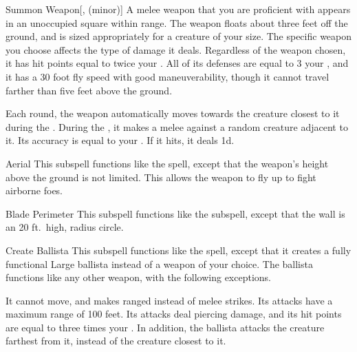 \begin{ability}[\nth{1}]{Summon Weapon}[,  (minor)]
A melee weapon that you are proficient with appears in an unoccupied square within \rngmed range.
The weapon floats about three feet off the ground, and is sized appropriately for a creature of your size.
The specific weapon you choose affects the type of damage it deals.
Regardless of the weapon chosen, it has hit points equal to twice your .
All of its defenses are equal to 3 \add your , and it has a 30 foot fly speed with good maneuverability, though it cannot travel farther than five feet above the ground.

Each round, the weapon automatically moves towards the creature closest to it during the .
During the , it makes a melee  against a random creature adjacent to it.
Its accuracy is equal to your .
If it hits, it deals  \minus1d.
\end{ability}
\vspace{0.25em}


\begin{ability}[\nth{2}]{Aerial}
This subspell functions like the  spell, except that the weapon's height above the ground is not limited.
This allows the weapon to fly up to fight airborne foes.
\end{ability}
\vspace{0.25em}


\begin{ability}[\nth{2}]{Blade Perimeter}
This subspell functions like the  subspell, except that the wall is an 20 ft.\ high, \areamed radius circle.
\end{ability}
\vspace{0.25em}


\begin{ability}[\nth{2}]{Create Ballista}
This subspell functions like the  spell, except that it creates a fully functional Large ballista instead of a weapon of your choice.
The ballista functions like any other weapon, with the following exceptions.

It cannot move, and makes ranged  instead of melee strikes.
Its attacks have a maximum range of 100 feet.
Its attacks deal piercing damage, and its hit points are equal to three times your .
In addition, the ballista attacks the creature farthest from it, instead of the creature closest to it.
\end{ability}
\vspace{0.25em}



